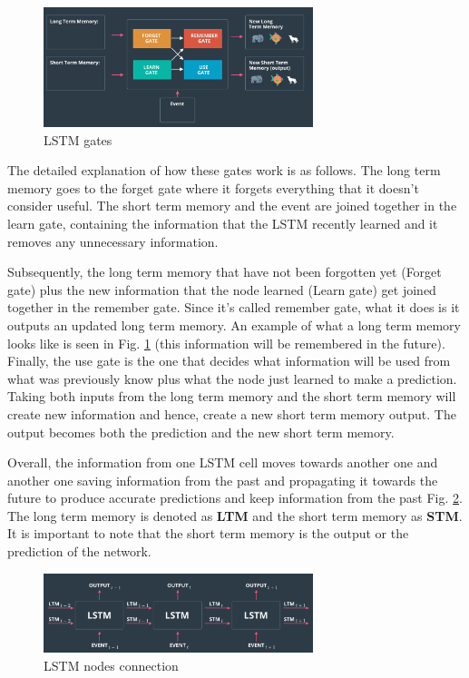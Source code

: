 \documentclass{article}
\begin{document}
\begin{figure}[ht]
    \centering
    \includegraphics[width=0.7\textwidth,height=0.7\textheight,keepaspectratio]{images/lstm_example2.png}
    \captionsetup{justification=centering}
    \caption{LSTM gates}
    \label{fig:f7}
\end{figure}

The detailed explanation of how these gates work is as follows. The long term memory goes to the forget gate where it forgets everything that it doesn't consider useful. The short term memory and the event are joined together in the learn gate, containing the information that the LSTM recently learned and it removes any unnecessary information.

Subsequently, the long term memory that have not been forgotten yet (Forget gate) plus the new information that the node learned (Learn gate) get joined together in the remember gate. Since it's called remember gate, what it does is it outputs an updated long term memory. An example of what a long term memory looks like is seen in Fig. \ref{fig:f7} (this information will be remembered in the future). Finally, the use gate is the one that decides what information will be used from what was previously know plus what the node just learned to make a prediction. Taking both inputs from the long term memory and the short term memory will create new information and hence, create a new short term memory output. The output becomes both the prediction and the new short term memory.
 
Overall, the information from one LSTM cell moves towards another one and another one saving information from the past and propagating it towards the future to produce accurate predictions and keep information from the past Fig. \ref{fig:f8}. The long term memory is denoted as \textbf{LTM} and the short term memory as \textbf{STM}. It is important to note that the short term memory is the output or the prediction of the network.
 
\begin{figure}[ht]
    \centering
    \includegraphics[width=0.7\textwidth,height=0.7\textheight,keepaspectratio]{images/lstm_nodes.png}
    \captionsetup{justification=centering}
    \caption{LSTM nodes connection}
    \label{fig:f8}
\end{figure}
 
\end{document}
